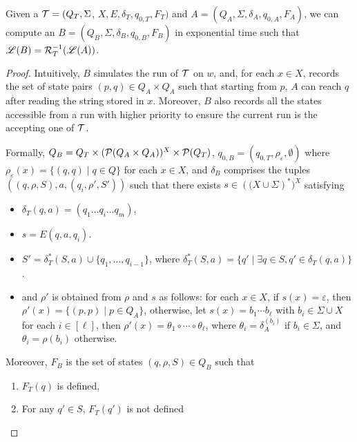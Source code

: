 \begin{theorem}
  \label{theorem:psst_preimage}
  Given a \PSST{} $\mathcal{T} = (Q_T, \Sigma$, $X, E, \delta_T, q_{0, T}, F_T)$ and \FA{} $A
  = (Q_A, \Sigma, \delta_A, q_{0, A}, F_A)$, we can compute an \FA{} $B = (Q_B,
  \Sigma, \delta_B, q_{0, B}, F_B)$ in exponential time  such that $\mathscr{L}(B) = \mathcal{R}^{-1}_T(\mathscr{L}({A}))$.
\end{theorem}
 
\begin{proof}
Intuitively, $B$ simulates the run of $\mathcal{T}$ on $w$, and, for each $x \in X$, records the set of state pairs $(p, q) \in Q_A \times Q_A$ such that starting from $p$, $A$ can reach $q$ after reading the string stored in $x$. Moreover, $B$ also records all the states accessible from a run with higher priority to ensure the current run is the accepting one of $\mathcal{T}$.

Formally, $Q_B = Q_T \times (\mathcal{P}(Q_A \times Q_A ))^{X} \times \mathcal{P}(Q_T)  $, $q_{0, B} = (q_{0, T}, \rho_{\varepsilon}, \emptyset)$ where $\rho_{\varepsilon} (x) = \{(q, q) \mid q \in Q\}$ for each $x \in X$, and $\delta_{B}$ comprises the tuples $((q, \rho, S), a, (q_i, \rho', S'))$ such that there exists $s \in \left((X \cup \Sigma\right)^*)^X$ satisfying
\begin{itemize}
\item $\delta_T (q, a) = (q_1 \ldots q_i \ldots q_m)$, 
\item $s = E(q,a,q_i)$.
\item $S' = \delta_T^{\ast} (S, a) \cup \{ q_1, \ldots, q_{i - 1} \}$, where $\delta_T^{\ast}(S,a) = \{q' \mid \exists q \in S, q' \in \delta_T(q,a)\}$.
\item and $\rho'$ is obtained from $\rho$ and $s$ as follows: for each $x \in X$, if $s(x) = \varepsilon$, then $\rho'(x) = \{(p, p) \mid p \in Q_A\}$, otherwise, let $s(x) = b_1 \cdots b_\ell$ with $b_i \in \Sigma \cup X$ for each $i \in [\ell]$, then $\rho'(x) = \theta_1 \circ \cdots \circ \theta_\ell$, where $\theta_i = \delta^{(b_i)}_A$ if $b_i \in \Sigma$, and $\theta_i = \rho(b_i)$ otherwise.
%
\end{itemize}

Moreover, $F_B$ is the set of states $(q, \rho, S) \in Q_B$ such that
\begin{enumerate}
  \item $F_T (q)$ is defined,
  \item For any $q' \in S$, $F_T (q')$ is not defined
  

\end{enumerate}
\end{proof}
